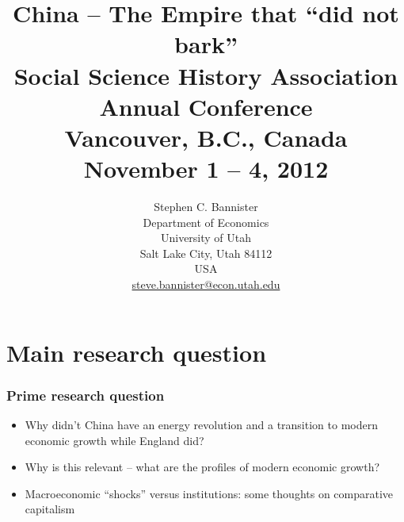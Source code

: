 \documentclass[final]{beamer}
\title{China -- The Empire that ``did not bark''\\
Social Science History Association Annual Conference\\
Vancouver, B.C., Canada\\
November 1 -- 4, 2012}
\author{Stephen C. Bannister\\
	Department of Economics\\
	University of Utah\\
	Salt Lake City, Utah 84112\\
	USA\\
	\href{mailto:steve.bannister@econ.utah.edu}{steve.bannister@econ.utah.edu}\\
	}
\begin{document}
\graphicspath{{./images/}}

\maketitle




\section{Main research question}
\begin{frame}
\frametitle{Prime research question}
\begin{itemize}
\item Why didn't China have an energy revolution and a transition to modern economic growth while England did?
\item Why is this relevant -- what are the profiles of modern economic growth?
\item Macroeconomic ``shocks'' versus institutions: some thoughts on comparative capitalism
\end{itemize}
\end{frame}
\end{document}
